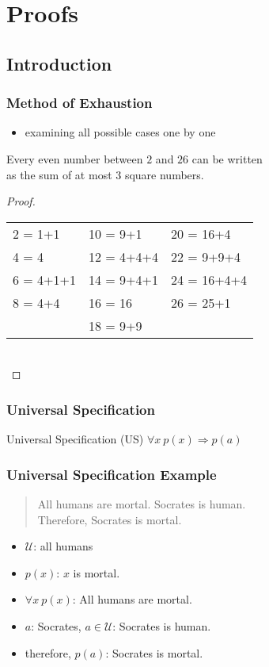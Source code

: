 \documentclass[dvipsnames]{beamer}
\begin{document}
\section{Proofs}

\subsection{Introduction}

\begin{frame}
  \frametitle{Method of Exhaustion}

  \begin{itemize}
    \item examining all possible cases one by one
  \end{itemize}

  \pause
  \begin{theorem}
    Every even number between $2$ and $26$ can be written\\
    as the sum of at most 3 square numbers.
  \end{theorem}

  \begin{proof}
    \begin{tabular}{lll}
      2 = 1+1   & 10 = 9+1    & 20 = 16+4\\
      4 = 4     & 12 = 4+4+4  & 22 = 9+9+4\\
      6 = 4+1+1 & 14 = 9+4+1  & 24 = 16+4+4\\
      8 = 4+4   & 16 = 16     & 26 = 25+1\\
                & 18 = 9+9    &
    \end{tabular}\\
  \end{proof}
\end{frame}

\begin{frame}
  \frametitle{Universal Specification}

  \begin{block}{Universal Specification (US)}
    $\forall x~p(x) \Rightarrow p(a)$
  \end{block}
\end{frame}

\begin{frame}
  \frametitle{Universal Specification Example}

  \begin{quote}
    All humans are mortal. Socrates is human.\\
    Therefore, Socrates is mortal.
  \end{quote}

  \pause
  \begin{itemize}
    \item $\mathcal{U}$: all humans
    \item $p(x)$: $x$ is mortal.
    \item $\forall x~p(x)$: All humans are mortal.
    \item $a$: Socrates, $a \in \mathcal{U}$: Socrates is human.
    \item therefore, $p(a)$: Socrates is mortal.
  \end{itemize}
\end{frame}
\end{document}

